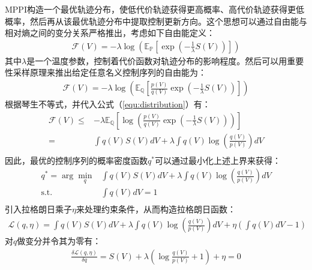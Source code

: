 MPPI构造一个最优轨迹分布，使低代价轨迹获得更高概率、高代价轨迹获得更低概率，然后再从该最优轨迹分布中提取控制更新方向。这个思想可以通过自由能与相对熵之间的变分关系严格推出，考虑如下自由能定义：
\begin{equation}
\begin{aligned}
    \mathcal{F}(V)=-\lambda \log \left(\mathbb{E}_{\mathbb{P}}\left[\exp \left(-\frac{1}{\lambda}S(V)\right)\right]\right)
\end{aligned}
\end{equation}
其中$\lambda$是一个温度参数，控制着代价函数对轨迹分布的影响程度。然后可以用重要性采样原理来推出给定任意名义控制序列的自由能为：
\begin{equation}
\begin{aligned}
    \mathcal{F}(V)=-\lambda \log \left(\mathbb{E}_{\mathbb{Q}}\left[\frac{p(V)}{q(V)}\exp \left(-\frac{1}{\lambda}S(V)\right)\right]\right)
\end{aligned}
\end{equation}
根据琴生不等式，并代入公式（\ref{equ:distribution}）有：
\begin{equation}
\begin{aligned}
    \mathcal{F}(V)\leq & -\lambda \mathbb{E}_{\mathbb{Q}}\left[ \log \left(\frac{p(V)}{q(V)}\exp \left(-\frac{1}{\lambda}S(V)\right)\right)\right]\\
    =& \int q(V)S(V) dV + \lambda \int q(V) \log \left(\frac{q(V)}{p(V)}\right) dV \\
\end{aligned}
\end{equation}
因此，最优的控制序列的概率密度函数$q^*$可以通过最小化上述上界来获得：
\begin{equation}
\begin{aligned}
    q^*= \arg \min_{q} &\int q(V)S(V) dV + \lambda \int q(V) \log \left(\frac{q(V)}{p(V)}\right) dV\\
    \text{s.t.}\quad & \int q(V) dV = 1 \\
\end{aligned}
\end{equation}
引入拉格朗日乘子$\eta$来处理约束条件，从而构造拉格朗日函数：
\begin{equation}
\begin{aligned}
    \mathcal{L}(q,\eta)=\int q(V)S(V) dV + \lambda \int q(V) \log \left(\frac{q(V)}{p(V)}\right) dV + \eta \left(\int q(V) dV - 1\right)
\end{aligned}
\end{equation}
对$q$做变分并令其为零有：
\begin{equation}
\begin{aligned}
    \frac{\delta \mathcal{L}(q,\eta)}{\delta q} = S(V)+\lambda \left(\log \frac{q(V)}{p(V)} + 1\right) + \eta = 0
\end{aligned}
\end{equation}
